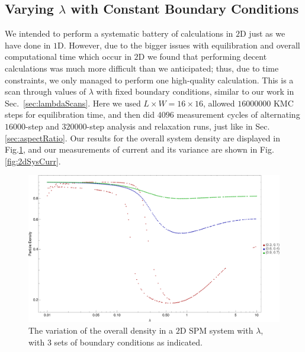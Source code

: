 \subsection{Varying $\lambda$ with Constant Boundary Conditions}
We intended to perform a systematic battery of calculations in $2$D just as we have done in $1$D.
However, due to the bigger issues with equilibration and overall computational time which occur in $2$D we found that performing decent calculations was much more difficult than we anticipated; thus, due to time constraints, we only managed to perform one high-quality calculation.
This is a scan through values of $\lambda$ with fixed boundary conditions, similar to our work
in Sec.~\ref{sec:lambdaScans}. Here we used $L \times W = 16 \times 16$, allowed $16000000$ KMC
steps for equilibration time, and then did $4096$ measurement cycles of alternating $16000$-step
and $320000$-step analysis and relaxation runs, just like in Sec.\ref{sec:aspectRatio}.
Our results for the overall system density are displayed in Fig.\ref{fig:2dSysDens}, and
our measurements of current and its variance are shown in Fig.\ref{fig:2dSysCurr}.
\begin{figure} \caption[The variation of the overall density in a $2$D SPM system with 
$\lambda$.]{The variation of the overall density in a $2$D SPM system with $\lambda$, with
$3$ sets of boundary conditions as indicated.} 
\label{fig:2dSysDens}
\begin{center}
\includegraphics[width=0.95\textheight, angle=270]{numerics/images/2d/2dDensity}
\end{center}
\end{figure}
